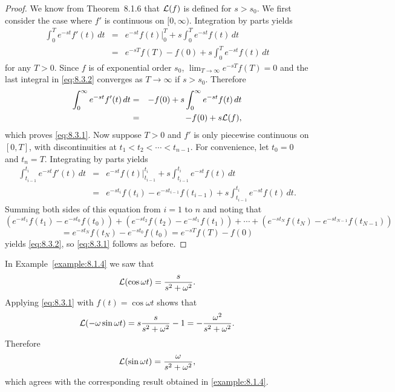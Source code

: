 \documentclass{ximera}
\begin{document}
\begin{proof}

We know from Theorem~8.1.6 that ${\cal L}(f)$ is defined for
$s>s_0$.
We first consider the case where $f'$ is continuous on $[0,\infty)$.
Integration by parts yields
\begin{equation}\label{eq:8.3.2}
\begin{array}{ccl}
\int^T_0 e^{-st}f'(t)\,dt &=& e^{-st}f(t)\Big|^T_0+s
\int^T_0e^{-st}f(t)\,dt\\
&=& e^{-sT}f(T)-f(0)+s\int^T_0 e^{-st}f(t)\,dt
\end{array}
\end{equation}
for any $T>0$. Since $f$ is of exponential order $s_0$,
 $\lim_{T\to \infty}e^{-sT}f(T)=0$ and the last integral in
\eqref{eq:8.3.2} converges as $T\to\infty$ if $s> s_0$. Therefore
\begin{eqnarray*}
\int^\infty_0 e^{-st}f'(t)\,dt&=&-f(0)+s\int^\infty_0
e^{-st}f(t)\,dt\\ &=&-f(0)+s{\cal L}(f),
\end{eqnarray*}
which proves  \eqref{eq:8.3.1}.
Now  suppose     $T>0$  and  $f'$  is  only piecewise continuous on
$[0,T]$, with discontinuities  at $t_1 <  t_2 <\cdots <  t_{n-1}$. For
convenience,  let  $t_0=0$  and  $t_n=T$.  Integrating by parts yields
\begin{eqnarray*}       \int^{t_i}_{t_{i-1}}e^{-st}f'(t)\,dt       &=&
e^{-st}f(t)\Big|^{t_i}_{t_{i-1}}+s\int^{t_i}_{t_{i-1}}e^{-st}f(t)\,dt\\
&=&                         e^{-st_i}                          f(t_i)-
e^{-st_{i-1}}f(t_{i-1})+s\int^{t_i}_{t_{i-1}}e^{-st}f(t)\,dt.
\end{eqnarray*} Summing both sides of this equation from $i=1$ to  $n$
and noting that
$$
\left(e^{-st_1}f(t_1)-e^{-st_0}f(t_0)\right)+\left(e^{-st_2}
f(t_2)-e^{-st_1}f(t_1)\right)
+\cdots+\left(e^{-st_N}f(t_N)-e^{-st_{N-1}}f(t_{N-1})\right)
$$
$$
=e^{-st_N}f(t_N)-e^{-st_0}f(t_0)=e^{-sT}f(T)-f(0)
$$
yields \eqref{eq:8.3.2}, so \eqref{eq:8.3.1} follows as before.
\end{proof}

\begin{example}\label{example:8.3.1}
 In Example~\ref{example:8.1.4} we saw that
$$
{\cal L}(\cos\omega t)=\frac{s}{s^2+\omega^2}.
$$
Applying  \eqref{eq:8.3.1} with $f(t)=\cos\omega t$ shows that
$$
{\cal L}(-\omega\sin\omega t)=s \frac{s}{s^2+\omega^2}-1=-
\frac{\omega^2}{s^2+\omega^2}.
$$
Therefore
$$
{\cal L}(\sin\omega t)=\frac{\omega}{s^2+\omega^2},
$$
which agrees with the corresponding  result obtained  in
\ref{example:8.1.4}.
\end{example}
\end{document}
